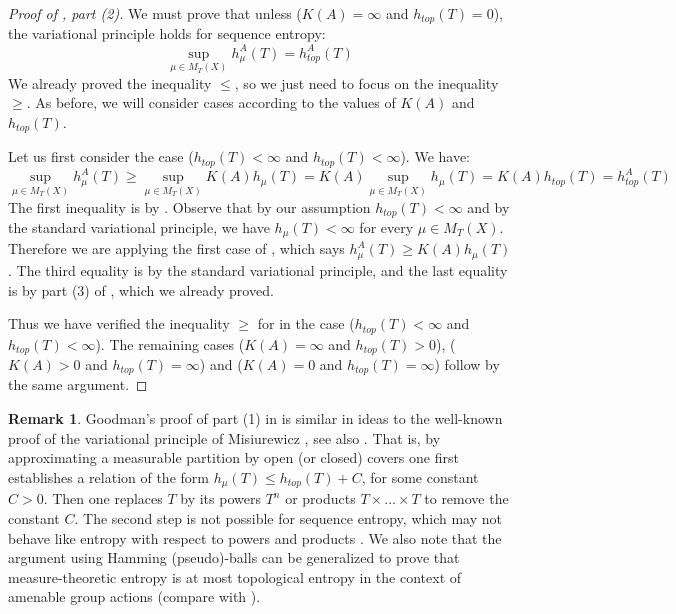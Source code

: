 \documentclass[a4paper,oneside]{amsart}
\renewcommand{\(}{\begin{dmath*}}
\renewcommand{\)}{\end{dmath*}}
\theoremstyle{definition}
\newtheorem{remark}{Remark}
\begin{document}
\begin{proof}[Proof of , part (2)]
We must prove that unless ($K(A)=\infty$ and $h_{top}(T)=0$), the variational principle holds for sequence entropy:
\begin{equation}\label{sequential-variational-principle-proof}
    \sup_{\mu\in M_T(X)} h^{A}_{\mu}(T) = h^A_{top}(T)
\end{equation}
We already proved the inequality $\leq$, so we just need to focus on the inequality $\geq$. As before, we will consider cases according to the values of $K(A)$ and $h_{top}(T)$.

Let us first consider the case ($h_{top}(T)<\infty$ and $h_{top}(T)<\infty$). We have:
\(
\sup_{\mu\in M_T(X)}h^{A}_{\mu}(T)\geq \sup _{\mu\in M_T(X)} K(A)h_{\mu}(T)=K(A)\sup _{\mu\in M_T(X)} h_{\mu}(T)=K(A)h_{top}(T)=h^A_{top}(T)
\)
The first inequality is by . Observe that by our assumption $h_{top}(T)<\infty$ and by the standard variational principle, we have $h_\mu(T)<\infty$ for every  $\mu\in M_T(X)$. Therefore we are applying the first case of , which says $h^{A}_{\mu}(T)\geq K(A)h_{\mu}(T)$. The third equality is by the standard variational principle, and the last equality is by part (3) of , which we already proved. 

Thus we have verified the inequality $\geq$ for  in the case ($h_{top}(T)<\infty$ and $h_{top}(T)<\infty$). The remaining cases ($K(A)=\infty$ and $h_{top}(T)>0$), ($K(A)>0$ and $h_{top}(T)=\infty$) and ($K(A)=0$ and $h_{top}(T)=\infty$) follow by the same argument. 
\end{proof}
\begin{remark}\label{remark:explanation-goodman-proof}
Goodman's proof of part (1) in  is similar in ideas to the well-known proof of the variational principle of Misiurewicz \cite{misiurewicz_short_nodate}, see also \cite{petersen_ergodic_1983,walters_introduction_2000}. That is, by approximating a measurable partition by open (or closed) covers one first establishes a relation of the form $h_{\mu}(T)\leq h_{top}(T)+C$, for some constant $C>0$. Then one replaces $T$ by its powers  $T^n$ or products $T\times\dots\times T$ to remove the constant $C$. The second step is not possible for sequence entropy, which may not behave like entropy with respect to powers and products \cite{lemanczyk_sequence_1985,hulse_counterexamples_2009}. We also note that the argument using Hamming (pseudo)-balls can be  generalized to prove that measure-theoretic entropy is at most topological entropy in the context of amenable group actions (compare with \cite[Theorem 9.48]{kerr_ergodic_2016}).
\end{remark}
\end{document}
